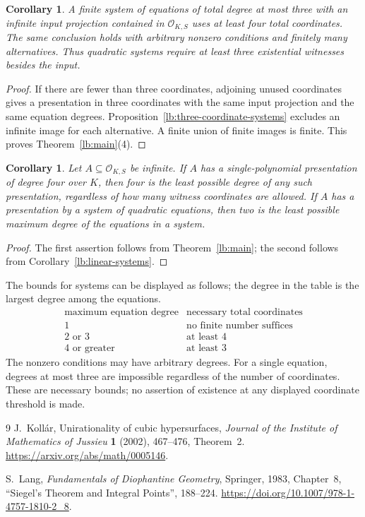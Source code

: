 \documentclass[11pt,a4paper]{article}
\newtheorem{corollary}[theorem]{Corollary}
\theoremstyle{definition}
\newcommand{\OKS}{\mathcal O_{K,S}}
\begin{document}
\begin{corollary}\label{lb:low-degree-systems}
A finite system of equations of total degree at most three
with an infinite input projection contained in $\OKS$ uses
at least four total coordinates. The same conclusion holds
with arbitrary nonzero conditions and finitely many alternatives.
Thus quadratic systems require at least three existential
witnesses besides the input.
\end{corollary}
\begin{proof}
If there are fewer than three coordinates, adjoining unused
coordinates gives a presentation in three coordinates with
the same input projection and the same equation degrees.
Proposition~\ref{lb:three-coordinate-systems} excludes an
infinite image for each alternative. A finite union of finite
images is finite. This proves Theorem~\ref{lb:main}(4).
\end{proof}

\begin{corollary}\label{lb:degree-sharpness}
Let $A\subseteq\OKS$ be infinite. If $A$ has a single-polynomial
presentation of degree four over $K$, then four is the least
possible degree of any such presentation, regardless of how many
witness coordinates are allowed. If $A$ has a presentation by a
system of quadratic equations, then two is the least possible
maximum degree of the equations in a system.
\end{corollary}
\begin{proof}
The first assertion follows from Theorem~\ref{lb:main}; the second
follows from Corollary~\ref{lb:linear-systems}.
\end{proof}

The bounds for systems can be displayed as follows; the degree
in the table is the largest degree among the equations.
\[
\begin{array}{c|c}
\text{maximum equation degree}&\text{necessary total coordinates}\\
\hline
1&\text{no finite number suffices}\\
2\text{ or }3&\text{at least }4\\
4\text{ or greater}&\text{at least }3
\end{array}
\]
The nonzero conditions may have arbitrary degrees. For a single
equation, degrees at most three are impossible regardless of the
number of coordinates. These are necessary bounds; no assertion
of existence at any displayed coordinate threshold is made.

\begin{thebibliography}{9}
J.~Koll\'ar, Unirationality of cubic hypersurfaces,
\emph{Journal of the Institute of Mathematics of Jussieu}
\textbf{1} (2002), 467--476, Theorem~2.
\url{https://arxiv.org/abs/math/0005146}.

S.~Lang, \emph{Fundamentals of Diophantine Geometry},
Springer, 1983, Chapter~8, ``Siegel's Theorem and Integral Points'',
188--224.
\url{https://doi.org/10.1007/978-1-4757-1810-2_8}.
\end{thebibliography}
\end{document}
